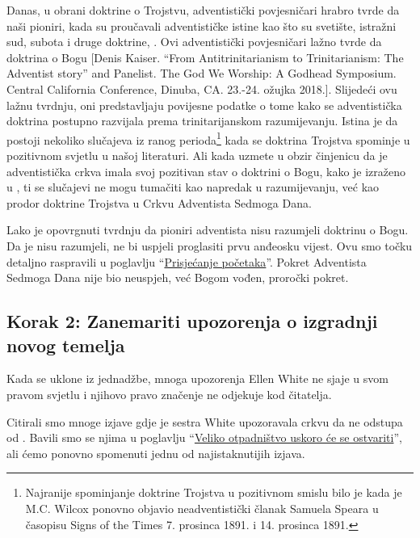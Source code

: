 Danas, u obrani doktrine o Trojstvu, adventistički povjesničari hrabro tvrde da naši pioniri, kada su proučavali adventističke istine kao što su svetište, istražni sud, subota i druge doktrine, . Ovi adventistički povjesničari lažno tvrde da doktrina o Bogu [Denis Kaiser. “From Antitrinitarianism to Trinitarianism: The Adventist story” and Panelist. The God We Worship: A Godhead Symposium. Central California Conference, Dinuba, CA. 23.-24. ožujka 2018.]. Slijedeći ovu lažnu tvrdnju, oni predstavljaju povijesne podatke o tome kako se adventistička doktrina postupno razvijala prema trinitarijanskom razumijevanju. Istina je da postoji nekoliko slučajeva iz ranog perioda\footnote{Najranije spominjanje doktrine Trojstva u pozitivnom smislu bilo je kada je M.C. Wilcox ponovno objavio neadventistički članak Samuela Speara u časopisu Signs of the Times 7. prosinca 1891. i 14. prosinca 1891.} kada se doktrina Trojstva spominje u pozitivnom svjetlu u našoj literaturi. Ali kada uzmete u obzir činjenicu da je adventistička crkva imala svoj pozitivan stav o doktrini o Bogu, kako je izraženo u , ti se slučajevi ne mogu tumačiti kao napredak u razumijevanju, već kao prodor doktrine Trojstva u Crkvu Adventista Sedmoga Dana.

Lako je opovrgnuti tvrdnju da pioniri adventista nisu razumjeli doktrinu o Bogu. Da je nisu razumjeli, ne bi uspjeli proglasiti prvu anđeosku vijest. Ovu smo točku detaljno raspravili u poglavlju “\hyperref[chap:remembering-the-beginning]{Prisjećanje početaka}”. Pokret Adventista Sedmoga Dana nije bio neuspjeh, već Bogom vođen, proročki pokret.

\subsection*{Korak 2: Zanemariti upozorenja o izgradnji novog temelja}

Kada se  uklone iz jednadžbe, mnoga upozorenja Ellen White ne sjaje u svom pravom svjetlu i njihovo pravo značenje ne odjekuje kod čitatelja.

Citirali smo mnoge izjave gdje je sestra White upozoravala crkvu da ne odstupa od . Bavili smo se njima u poglavlju “\hyperref[chap:apostasy]{Veliko otpadništvo uskoro će se ostvariti}”, ali ćemo ponovno spomenuti jednu od najistaknutijih izjava.

